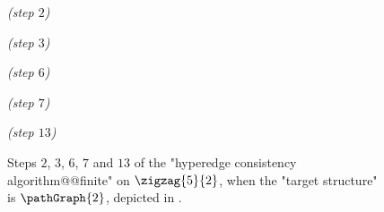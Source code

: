 \begin{figure}
	\centering
	\begin{tikzpicture}
		
		
	\end{tikzpicture}
	\quad\emph{(step $2$)~}\\[2em]
	\begin{tikzpicture}
		
		
	\end{tikzpicture}
	\quad\emph{(step $3$)~}\\[2em]
	\begin{tikzpicture}
		
		
	\end{tikzpicture}
	\quad\emph{(step $6$)~}\\[2em]
	\begin{tikzpicture}
		
		
	\end{tikzpicture}
	\quad\emph{(step $7$)~}\\[2em]
	\begin{tikzpicture}
		
		
	\end{tikzpicture}
	\quad\emph{(step $13$)}
	\caption{%
		\AP\label{fig:zigzag-graph-HC-P2}
		Steps $2$, $3$, $6$, $7$ and $13$ of the "hyperedge consistency algorithm@@finite"
		on $\zigzag{5}{2}$,
		when the "target structure" is $\pathGraph{2}$, depicted in .%
	}
\end{figure}
\begin{marginfigure}
	\centering
	\begin{tikzpicture}
		
	\end{tikzpicture}
	\caption{
		\AP\label{fig:zigzag-graph-HC-P2-side-P2}
		The "$2$-path" $\pathGraph{2}$.
	}
\end{marginfigure}
